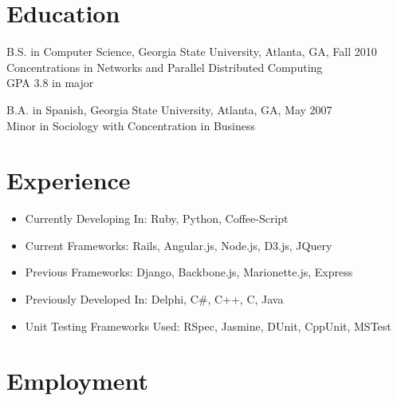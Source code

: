 \documentclass[margin]{res}
\begin{document}

\address{204 Drexel Ave Apt B \\ Decatur, GA 30030  \\
        (678) 773-1545 }

\begin{resume}

\section{Education}
    B.S. in Computer Science, Georgia State University, Atlanta, GA, Fall 2010  \\
    Concentrations in Networks and Parallel Distributed Computing \\
    GPA 3.8 in major

    B.A. in Spanish, Georgia State University, Atlanta, GA, May 2007 \\
    Minor in Sociology with Concentration in Business


\section{Experience}
    \begin{itemize} \itemsep -2pt  %
        \item Currently Developing In: Ruby, Python, Coffee-Script
        \item Current Frameworks: Rails, Angular.js, Node.js, D3.js, JQuery
        \item Previous Frameworks: Django, Backbone.js, Marionette.js, Express
        \item Previously Developed In: Delphi, C\#, C++, C, Java
        \item Unit Testing Frameworks Used: RSpec, Jasmine, DUnit, CppUnit, MSTest
    \end{itemize}

\section{Employment}


\end{resume}
\end{document}
